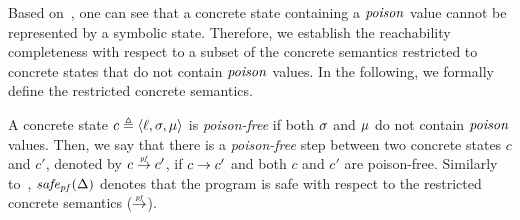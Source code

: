 Based on~,
one can see that a concrete state containing a $\mathit{poison}$ value cannot be represented by a symbolic state.
Therefore, we establish the reachability completeness with respect to a subset of the concrete semantics restricted to concrete states that do not contain $\mathit{poison}$ values.
In the following, we formally define the restricted concrete semantics.


\begin{definition}
\label{def:ns-step}
A concrete state $c \triangleq \langle{\ell},{\sigma},{\mathit{\mu}}\rangle$ is \emph{poison-free}
if both $\sigma$ and $\mathit{\mu}$ do not contain $\mathit{poison}$ values.
Then, we say that there is a \emph{poison-free} step between two concrete states $c$ and $c'$, denoted by $c \nsstep c'$,
if $c \rightarrow c'$ and both $c$ and $c'$ are poison-free.
Similarly to~,
$\mathit{safe_{pf}}(\Delta)$ denotes that the program is safe with respect to the restricted concrete semantics ($\nsstep$).
\end{definition}

%
%

